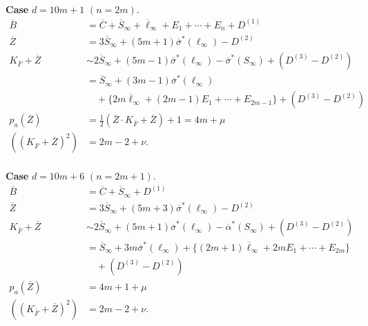 \paragraph{}\label{chap3:3.5.1.1}
{\bf Case} $d=10m+1$ $(n=2m)$.
\begin{align*}
\overline{B} &=
\overline{C}+\overline{S}_{\infty}+\overline{\ell}_{\infty}+E_{1}+\cdots+E_{n}+D^{(1)}\\
\overline{Z} &=
3\overline{S}_{\infty}+(5m+1)\overline{\sigma}^{\ast}(\ell_{\infty})-D^{(2)}\\ 
K_{\overline{F}}+\overline{Z} &\sim
2\overline{S}_{\infty}+(5m-1)\overline{\sigma}^{\ast}(\ell_{\infty})-\overline{\sigma}^{\ast}(S_{\infty})+(D^{(3)}-D^{(2)})\\
&=
\overline{S}_{\infty}+(3m-1)\overline{\sigma}^{\ast}(\ell_{\infty})\\
&\quad +\{2m\overline{\ell}_{\infty}+(2m-1)E_{1}+\cdots+E_{2m-1}\}+(D^{(3)}-D^{(2)})\\
p_{a}(\overline{Z}) &= \frac{1}{2}(\overline{Z}\cdot
K_{\overline{F}}+\overline{Z})+1=4m+\mu\\
((K_{\overline{F}}+\overline{Z})^{2}) &= 2m-2+\nu. 
\end{align*}

\paragraph{}\label{chap3:3.5.1.2}
{\bf Case} $d=10m+6$ $(n=2m+1)$.
\begin{align*}
\overline{B} &= \overline{C}+\overline{S}_{\infty}+D^{(1)}\\
\overline{Z} &=
3\overline{S}_{\infty}+(5m+3)\overline{\sigma}^{\ast}(\ell_{\infty})-D^{(2)}\\
K_{\overline{F}}+\overline{Z} &\sim
2\overline{S}_{\infty}+(5m+1)\overline{\sigma}^{\ast}(\ell_{\infty})-\overline{\alpha}^{\ast}(S_{\infty})+(D^{(3)}-D^{(2)})\\
&=
\overline{S}_{\infty}+3m\overline{\sigma}^{\ast}(\ell_{\infty})+\{(2m+1)\overline{\ell}_{\infty}+2mE_{1}+\cdots+E_{2m}\}\\
&\quad +(D^{(3)}-D^{(2)})\\
p_{a}(\overline{Z}) &= 4m+1+\mu\\
((K_{\overline{F}}+\overline{Z})^{2}) &= 2m-2+\nu.
\end{align*}

